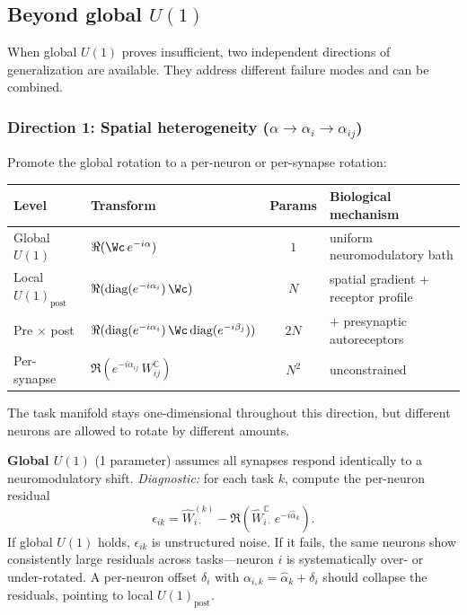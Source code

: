 \documentclass[11pt]{article}
\begin{document}
\subsection{Beyond global $U(1)$}
\label{sec:beyond}

When global $U(1)$ proves insufficient, two independent directions 
of generalization are available. They address different failure modes 
and can be combined.

\subsubsection{Direction 1: Spatial heterogeneity ($\alpha \to \alpha_i \to \alpha_{ij}$)}

Promote the global rotation to a per-neuron or per-synapse rotation:

\begin{center}
\renewcommand{\arraystretch}{1.3}
\begin{tabular}{@{}llcl@{}}
\toprule
\textbf{Level} & \textbf{Transform} & \textbf{Params} & 
\textbf{Biological mechanism} \\
\midrule
Global $U(1)$ & $\Re(\Wc\, e^{-i\alpha})$ & $1$ & 
uniform neuromodulatory bath \\
Local $U(1)_{\text{post}}$ & 
$\Re(\text{diag}(e^{-i\alpha_i})\,\Wc)$ & $N$ & 
spatial gradient $+$ receptor profile \\
Pre $\times$ post & 
$\Re(\text{diag}(e^{-i\alpha_i})\,\Wc\,
\text{diag}(e^{-i\beta_j}))$ & $2N$ & 
$+$ presynaptic autoreceptors \\
Per-synapse & $\Re(e^{-i\alpha_{ij}}\,W_{ij}^{\mathbb{C}})$ & $N^2$ & 
unconstrained \\
\bottomrule
\end{tabular}
\end{center}

The task manifold stays one-dimensional throughout this direction, 
but different neurons are allowed to rotate by different amounts.

\textbf{Global $U(1)$} (1 parameter) assumes all synapses respond 
identically to a neuromodulatory shift. \emph{Diagnostic:} for each 
task $k$, compute the per-neuron residual
\begin{equation}
\epsilon_{ik} = \hat{W}^{(k)}_{i\cdot} 
- \Re\!\left(\hat{W}^{\mathbb{C}}_{i\cdot}\, e^{-i\hat{\alpha}_k}\right).
\end{equation}
If global $U(1)$ holds, $\epsilon_{ik}$ is unstructured noise. If 
it fails, the same neurons show consistently large residuals across 
tasks---neuron $i$ is systematically over- or under-rotated. A 
per-neuron offset $\delta_i$ with $\alpha_{i,k} = \hat{\alpha}_k 
+ \delta_i$ should collapse the residuals, pointing to local 
$U(1)_{\text{post}}$.
\end{document}
